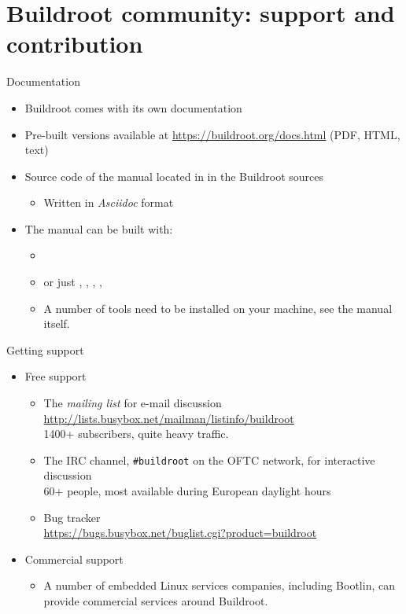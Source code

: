 \section{Buildroot community: support and contribution}

\begin{frame}{Documentation}
  \begin{itemize}
  \item Buildroot comes with its own documentation
  \item Pre-built versions available at
    \url{https://buildroot.org/docs.html} (PDF, HTML, text)
  \item Source code of the manual located in  in the
    Buildroot sources
    \begin{itemize}
    \item Written in {\em Asciidoc} format
    \end{itemize}
  \item The manual can be built with:
    \begin{itemize}
    \item {}
    \item or just , , , , 
    \item A number of tools need to be installed on your machine,
      see the manual itself.
    \end{itemize}
  \end{itemize}
\end{frame}

\begin{frame}{Getting support}
  \begin{itemize}
  \item Free support
    \begin{itemize}
    \item The {\em mailing list} for e-mail discussion\\
      {\footnotesize \url{http://lists.busybox.net/mailman/listinfo/buildroot}}\\
      1400+ subscribers, quite heavy traffic.
    \item The IRC channel, {\tt \#buildroot} on the OFTC network,
      for interactive discussion\\
      60+ people, most available during European daylight hours
    \item Bug tracker\\
      \url{https://bugs.busybox.net/buglist.cgi?product=buildroot}
    \end{itemize}
  \item Commercial support
    \begin{itemize}
    \item A number of embedded Linux services companies, including
      Bootlin, can provide commercial services around
      Buildroot.
    \end{itemize}
  \end{itemize}
\end{frame}

